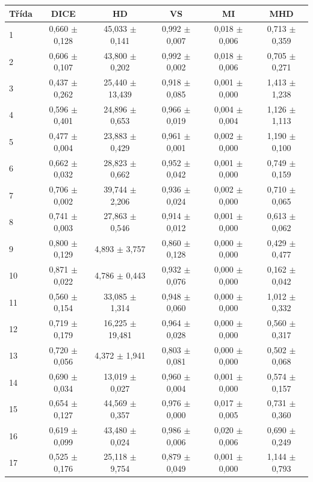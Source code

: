 \begin{tabular}{l c c c c c}
 \hline
Třída & DICE & HD & VS & MI & MHD \\ \hline
1 & 0,660 $\pm$ 0,128 & 45,033 $\pm$ 0,141 & 0,992 $\pm$ 0,007 & 0,018 $\pm$ 0,006 & 0,713 $\pm$ 0,359 \\
2 & 0,606 $\pm$ 0,107 & 43,800 $\pm$ 0,202 & 0,992 $\pm$ 0,002 & 0,018 $\pm$ 0,006 & 0,705 $\pm$ 0,271 \\
3 & 0,437 $\pm$ 0,262 & 25,440 $\pm$ 13,439 & 0,918 $\pm$ 0,085 & 0,001 $\pm$ 0,000 & 1,413 $\pm$ 1,238 \\
4 & 0,596 $\pm$ 0,401 & 24,896 $\pm$ 0,653 & 0,966 $\pm$ 0,019 & 0,004 $\pm$ 0,004 & 1,126 $\pm$ 1,113 \\
5 & 0,477 $\pm$ 0,004 & 23,883 $\pm$ 0,429 & 0,961 $\pm$ 0,001 & 0,002 $\pm$ 0,000 & 1,190 $\pm$ 0,100 \\
6 & 0,662 $\pm$ 0,032 & 28,823 $\pm$ 0,662 & 0,952 $\pm$ 0,042 & 0,001 $\pm$ 0,000 & 0,749 $\pm$ 0,159 \\
7 & 0,706 $\pm$ 0,002 & 39,744 $\pm$ 2,206 & 0,936 $\pm$ 0,024 & 0,002 $\pm$ 0,000 & 0,710 $\pm$ 0,065 \\
8 & 0,741 $\pm$ 0,003 & 27,863 $\pm$ 0,546 & 0,914 $\pm$ 0,012 & 0,001 $\pm$ 0,000 & 0,613 $\pm$ 0,062 \\
9 & 0,800 $\pm$ 0,129 & 4,893 $\pm$ 3,757 & 0,860 $\pm$ 0,128 & 0,000 $\pm$ 0,000 & 0,429 $\pm$ 0,477 \\
10 & 0,871 $\pm$ 0,022 & 4,786 $\pm$ 0,443 & 0,932 $\pm$ 0,076 & 0,000 $\pm$ 0,000 & 0,162 $\pm$ 0,042 \\
11 & 0,560 $\pm$ 0,154 & 33,085 $\pm$ 1,314 & 0,948 $\pm$ 0,060 & 0,000 $\pm$ 0,000 & 1,012 $\pm$ 0,332 \\
12 & 0,719 $\pm$ 0,179 & 16,225 $\pm$ 19,481 & 0,964 $\pm$ 0,028 & 0,000 $\pm$ 0,000 & 0,560 $\pm$ 0,317 \\
13 & 0,720 $\pm$ 0,056 & 4,372 $\pm$ 1,941 & 0,803 $\pm$ 0,081 & 0,000 $\pm$ 0,000 & 0,502 $\pm$ 0,068 \\
14 & 0,690 $\pm$ 0,034 & 13,019 $\pm$ 0,027 & 0,960 $\pm$ 0,004 & 0,001 $\pm$ 0,000 & 0,574 $\pm$ 0,157 \\
15 & 0,654 $\pm$ 0,127 & 44,569 $\pm$ 0,357 & 0,976 $\pm$ 0,000 & 0,017 $\pm$ 0,005 & 0,731 $\pm$ 0,360 \\
16 & 0,619 $\pm$ 0,099 & 43,480 $\pm$ 0,024 & 0,986 $\pm$ 0,006 & 0,020 $\pm$ 0,006 & 0,690 $\pm$ 0,249 \\
17 & 0,525 $\pm$ 0,176 & 25,118 $\pm$ 9,754 & 0,879 $\pm$ 0,049 & 0,001 $\pm$ 0,000 & 1,144 $\pm$ 0,793 \\

\end{tabular}
